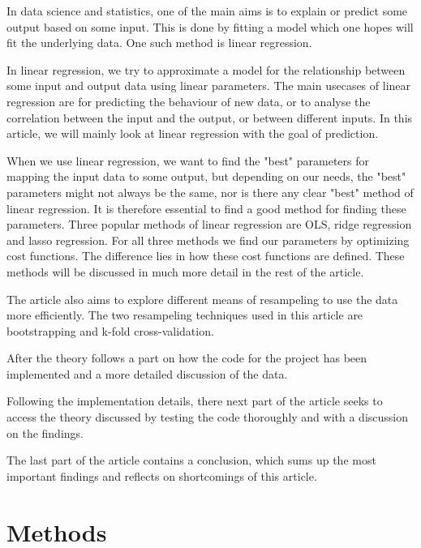 \documentclass[12pt]{article}
\begin{document}
In data science and statistics, one of the main aims is to explain or predict some output based on some input. This is done by fitting a model which one hopes will fit the underlying data. One such method is linear regression.

In linear regression, we try to approximate a model for the relationship between some input and output data using linear parameters.
The main usecases of linear regression are for predicting the behaviour of new data, or to analyse the correlation between the input and the output, or between different inputs.
In this article, we will mainly look at linear regression with the goal of prediction.

When we use linear regression, we want to find the "best" parameters for mapping the input data to some output, but depending on our needs, the "best" parameters might not always be the same, nor is there any clear "best" method of linear regression.
It is therefore essential to find a good method for finding these parameters.
Three popular methods of linear regression are OLS, ridge regression and lasso regression.
For all three methods we find our parameters by optimizing cost functions.
The difference lies in how these cost functions are defined.
These methods will be discussed in much more detail in the rest of the article.

The article also aims to explore different means of resampeling to use the data more efficiently. The two resampeling techniques used in this article are bootstrapping and k-fold cross-validation.

After the theory follows a part on how the code for the project has been implemented and a more detailed discussion of the data.

Following the implementation details, there next part of the article seeks to access the theory discussed by testing the code thoroughly and with a discussion on the findings.

The last part of the article contains a conclusion, which sums up the most important findings and reflects on shortcomings of this article.

\section{Methods}
\end{document}
